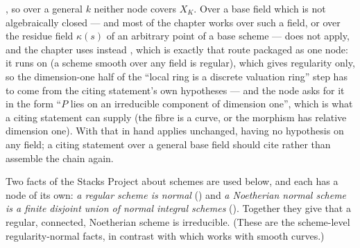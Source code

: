 \begin{remark}
, so over a general
$k$ neither node covers $X_K$.  Over a base field which is not
algebraically closed --- and most of the chapter works
over such a field, or over the residue field $\kappa(s)$ of an arbitrary
point of a base scheme ---  does not apply, and the
chapter uses instead , which is
exactly that route packaged as one node: it runs on
 (a scheme smooth over any field
is regular), which gives regularity only, so the dimension-one half of
the ``local ring is a discrete valuation ring'' step has to come from
the citing statement's own hypotheses --- and the node asks for it in
the form ``$P$ lies on an irreducible component of dimension one'',
which is what a citing statement can supply (the fibre is a curve, or
the morphism has relative dimension one).  With that in hand
 applies unchanged, having no hypothesis
on any field; a citing statement over a general base field should cite
 rather than assemble the chain
again.
%
\end{remark}

\begin{remark}\label{rem:pc-regular-normal}
Two facts of the Stacks Project about schemes are used below, and each has
a node of its own: \emph{a regular scheme is normal}
() and \emph{a Noetherian normal scheme is a
finite disjoint union of normal integral schemes}
().  Together they give that a
regular, connected, Noetherian scheme is irreducible.  (These are the
scheme-level regularity-normal facts, in contrast with
 which works with smooth curves.)
\end{remark}

